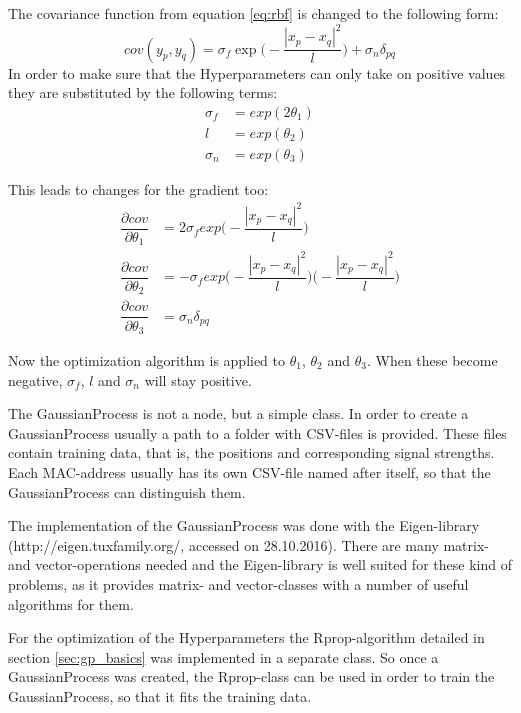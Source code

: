 The covariance function from equation \ref{eq:rbf} is changed to the following form:
\begin{equation}
cov(y_p,y_q) = \sigma_f \exp\bigg(-\dfrac{|x_p-x_q|^2}{l}\bigg) + \sigma_n \delta_{pq}
\end{equation}
In order to make sure that the \gls{Hyperparameter}s can only take on positive values they are substituted by the following terms:
\begin{equation}
\begin{aligned}
\sigma_f &= exp(2\theta_1)\\
l &= exp(\theta_2)\\
\sigma_n &= exp(\theta_3)
\end{aligned}
\end{equation}

This leads to changes for the gradient too:
\begin{equation}
\begin{aligned}
\dfrac{\partial cov}{\partial \theta_1} &= 2\sigma_f exp\bigg(-\dfrac{|x_p-x_q|^2}{l}\bigg)\\
\dfrac{\partial cov}{\partial \theta_2} &= -\sigma_f exp\bigg(-\dfrac{|x_p-x_q|^2}{l}\bigg)\bigg(-\dfrac{|x_p-x_q|^2}{l}\bigg)\\
\dfrac{\partial cov}{\partial \theta_3} &= \sigma_n\delta_{pq}
\end{aligned}
\end{equation}

Now the optimization algorithm is applied to $\theta_1$, $\theta_2$ and $\theta_3$. When these become negative, $\sigma_f$, $l$ and $\sigma_n$ will stay positive. 

The \Gls{GaussianProcess} is not a node, but a simple class. In order to create a \Gls{GaussianProcess} usually a path to a folder with CSV-files is provided. These files contain training data, that is, the positions and corresponding signal strengths. Each \Gls{MAC-address} usually has its own CSV-file named after itself, so that the \Gls{GaussianProcess} can distinguish them.

The implementation of the \Gls{GaussianProcess} was done with the Eigen-library (http://eigen.tuxfamily.org/, accessed on 28.10.2016). There are many matrix- and vector-operations needed and the Eigen-library is well suited for these kind of problems, as it provides matrix- and vector-classes with a number of useful algorithms for them. 

For the optimization of the \gls{Hyperparameter}s the Rprop-algorithm detailed in section \ref{sec:gp_basics} was implemented in a separate class. So once a \Gls{GaussianProcess} was created, the Rprop-class can be used in order to train the \Gls{GaussianProcess}, so that it fits the training data. 

